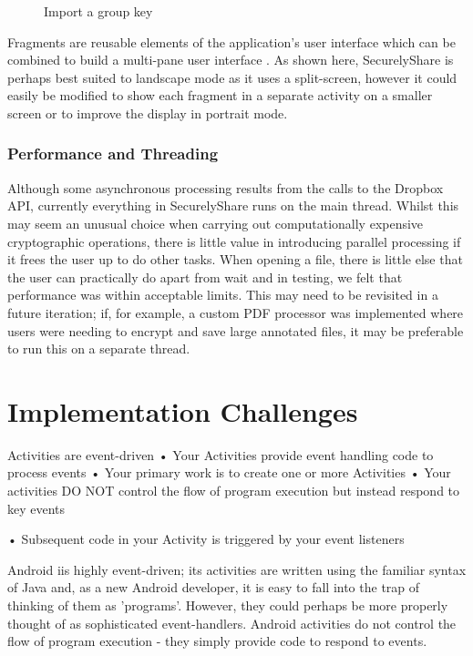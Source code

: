 \begin{figure}[h!]
                                                                                                                                                                                                           
    \caption{Import a group key }
    \label{fig:import}
\end{figure}

Fragments are reusable elements of the application's user interface which can be combined to build a multi-pane user interface \cite{androiddev3}. As shown here, SecurelyShare is perhaps  best suited to landscape mode as it uses a split-screen, however it could easily be modified to show each fragment in a separate activity on a smaller screen or to improve the display in portrait mode.

\subsubsection*{Performance and Threading}
Although some asynchronous processing results from the calls to the Dropbox API, currently everything in SecurelyShare runs on the main thread.  Whilst this may seem an unusual choice when carrying out computationally expensive cryptographic operations, there is little value in introducing parallel processing if it frees the user up to do other tasks.  When opening a file, there is little else that the user can practically do apart from wait and in testing, we felt that performance was within acceptable limits.  This may need to be revisited in a future iteration;  if, for example, a custom PDF processor was implemented where users were needing to encrypt and save large annotated files, it may be preferable to run this on a separate thread.


\section{Implementation Challenges}
 Activities are event-driven 
• Your Activities provide event handling code to process events 
• Your primary work is to create one or more Activities 
• Your activities DO NOT control the flow of program execution but 
instead respond to key events 

• Subsequent code in your Activity is triggered by your event listeners 


Android iis highly event-driven; its activities are written using the familiar syntax of Java and, as a new Android developer, it is easy to fall into the trap of thinking of them as 'programs'.  However, they could perhaps be more properly thought of as sophisticated event-handlers.  Android activities do not control the flow of program execution - they simply provide code to respond to events.  

